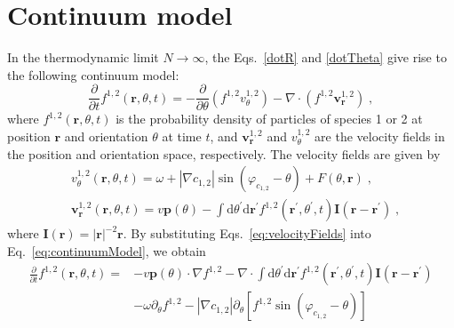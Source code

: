 \documentclass{article}
\begin{document}
\section{Continuum model}
In the thermodynamic limit $N\rightarrow \infty$, the Eqs.~\eqref{dotR} and \eqref{dotTheta} give rise to the following continuum model:
\begin{equation}
    \frac{\partial}{\partial t}f ^{1,2}\left( \mathbf{r},\theta ,t \right) =-\frac{\partial}{\partial \theta}\left( f ^{1,2}v_{\theta}^{1,2} \right) -\nabla \cdot \left( f ^{1,2}\mathbf{v}_{\mathbf{r}}^{1,2} \right) \;, \label{eq:continuumModel}
\end{equation}
where $f^{1,2}\left( \mathbf{r},\theta ,t \right)$ is the probability density of particles of species 1 or 2 at position $\mathbf{r}$ and orientation $\theta$ at time $t$, and $\mathbf{v}_{\mathbf{r}}^{1,2}$ and $v_{\theta}^{1,2}$ are the velocity fields in the position and orientation space, respectively. The velocity fields are given by
\begin{subequations}
    \begin{align}
        &v_{\theta}^{1,2}\left( \mathbf{r},\theta ,t \right) =\omega +\left| \nabla c_{1,2} \right|\sin \left( \varphi _{c_{1,2}} -\theta \right) +F\left( \theta ,\mathbf{r} \right)  \;,\\
        &\mathbf{v}_{\mathbf{r}}^{1,2}\left( \mathbf{r},\theta ,t \right) =v\mathbf{p}\left( \theta \right) -\int{\mathrm{d}\theta ^{\prime} \mathrm{d}\mathbf{r}^{\prime} f ^{1,2}\left( \mathbf{r}^{\prime} ,\theta ^{\prime} ,t \right) \mathbf{I}\left( \mathbf{r}-\mathbf{r}^{\prime} \right)} \;,
    \end{align}
    \label{eq:velocityFields}
\end{subequations}
where $\mathbf{I}\left( \mathbf{r} \right)=|\mathbf{r}|^{-2}\mathbf{r}$. By substituting Eqs.~\eqref{eq:velocityFields} into Eq.~\eqref{eq:continuumModel}, we obtain
\begin{equation}
    \begin{aligned}
        \frac{\partial}{\partial t}f ^{1,2}\left( \mathbf{r},\theta ,t \right) =&-v\mathbf{p}\left( \theta \right) \cdot \nabla f ^{1,2}-\nabla \cdot \int{\mathrm{d}\theta ^{\prime} \mathrm{d}\mathbf{r}^{\prime} f ^{1,2}\left( \mathbf{r}^{\prime} ,\theta ^{\prime} ,t \right) \mathbf{I}\left( \mathbf{r}-\mathbf{r}^{\prime} \right)}\\
        &-\omega \partial _{\theta}f ^{1,2}-\left| \nabla c_{1,2} \right|\partial _{\theta}\left[ f ^{1,2}\sin \left( \varphi _{c_{1,2}}-\theta \right) \right]
    \end{aligned}
\end{equation}
\end{document}
